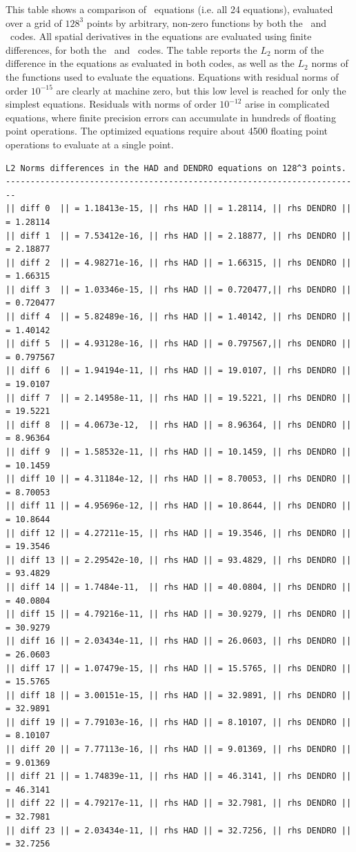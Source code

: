 This table shows a comparison of \BSSN\ equations (i.e. all 24 equations),
evaluated over a grid of $128^3$ points by arbitrary, non-zero functions
by both the \dendro\ and \HAD\ codes. All spatial derivatives in the equations
are evaluated using finite differences, for both the
\dendro\ and \HAD\ codes.
The table reports the $L_2$ norm of the difference in the equations
as evaluated in both codes, 
as well as the $L_2$ norms of the functions used to evaluate the equations.
Equations with residual norms of order $10^{-15}$ are clearly at machine zero, 
but this low level is reached for only the simplest equations. Residuals with
norms of order $10^{-12}$ arise in complicated equations, where finite precision  
errors can accumulate in hundreds of floating point operations. The optimized
equations require about 4500 floating point operations to evaluate at a single point.

\begin{lstlisting}[basicstyle=\tiny]
L2 Norms differences in the HAD and DENDRO equations on 128^3 points.
------------------------------------------------------------------------
|| diff 0  || = 1.18413e-15, || rhs HAD || = 1.28114, || rhs DENDRO || = 1.28114
|| diff 1  || = 7.53412e-16, || rhs HAD || = 2.18877, || rhs DENDRO || = 2.18877
|| diff 2  || = 4.98271e-16, || rhs HAD || = 1.66315, || rhs DENDRO || = 1.66315
|| diff 3  || = 1.03346e-15, || rhs HAD || = 0.720477,|| rhs DENDRO || = 0.720477
|| diff 4  || = 5.82489e-16, || rhs HAD || = 1.40142, || rhs DENDRO || = 1.40142
|| diff 5  || = 4.93128e-16, || rhs HAD || = 0.797567,|| rhs DENDRO || = 0.797567
|| diff 6  || = 1.94194e-11, || rhs HAD || = 19.0107, || rhs DENDRO || = 19.0107
|| diff 7  || = 2.14958e-11, || rhs HAD || = 19.5221, || rhs DENDRO || = 19.5221
|| diff 8  || = 4.0673e-12,  || rhs HAD || = 8.96364, || rhs DENDRO || = 8.96364
|| diff 9  || = 1.58532e-11, || rhs HAD || = 10.1459, || rhs DENDRO || = 10.1459
|| diff 10 || = 4.31184e-12, || rhs HAD || = 8.70053, || rhs DENDRO || = 8.70053
|| diff 11 || = 4.95696e-12, || rhs HAD || = 10.8644, || rhs DENDRO || = 10.8644
|| diff 12 || = 4.27211e-15, || rhs HAD || = 19.3546, || rhs DENDRO || = 19.3546
|| diff 13 || = 2.29542e-10, || rhs HAD || = 93.4829, || rhs DENDRO || = 93.4829
|| diff 14 || = 1.7484e-11,  || rhs HAD || = 40.0804, || rhs DENDRO || = 40.0804
|| diff 15 || = 4.79216e-11, || rhs HAD || = 30.9279, || rhs DENDRO || = 30.9279
|| diff 16 || = 2.03434e-11, || rhs HAD || = 26.0603, || rhs DENDRO || = 26.0603
|| diff 17 || = 1.07479e-15, || rhs HAD || = 15.5765, || rhs DENDRO || = 15.5765
|| diff 18 || = 3.00151e-15, || rhs HAD || = 32.9891, || rhs DENDRO || = 32.9891
|| diff 19 || = 7.79103e-16, || rhs HAD || = 8.10107, || rhs DENDRO || = 8.10107
|| diff 20 || = 7.77113e-16, || rhs HAD || = 9.01369, || rhs DENDRO || = 9.01369
|| diff 21 || = 1.74839e-11, || rhs HAD || = 46.3141, || rhs DENDRO || = 46.3141
|| diff 22 || = 4.79217e-11, || rhs HAD || = 32.7981, || rhs DENDRO || = 32.7981
|| diff 23 || = 2.03434e-11, || rhs HAD || = 32.7256, || rhs DENDRO || = 32.7256
\end{lstlisting}

